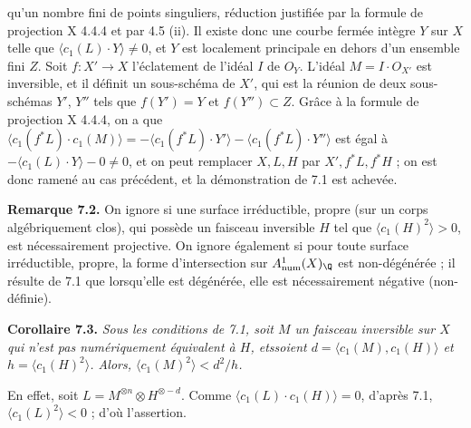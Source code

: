 
qu'un
nombre fini de points singuliers, r\'eduction justifi\'ee par la formule de projection X 4.4.4 et par 4.5 (ii). Il existe donc une courbe ferm\'ee int\`egre $Y$ sur $X$ telle que $\langle c_1(L)\cdot Y\rangle\ne0$, et $Y$ est localement principale en dehors d'un ensemble fini $Z$. Soit $f:X'\to X$ l'\'eclatement de l'id\'eal $I$ de ${O}_Y$. L'id\'eal $M=I\cdot{O}_{X'}$ est inversible, et il d\'efinit un sous-sch\'ema de $X'$, qui est la r\'eunion de deux sous-sch\'emas $Y'$, $Y''$ tels que $f(Y')=Y$ et $f(Y'')\subset Z$. Gr\^ace \`a la formule de projection X 4.4.4, on a que $\langle c_1(f^*L)\cdot c_1(M)\rangle=-\langle c_1(f^*L)\cdot Y'\rangle-\langle c_1(f^*L)\cdot Y''\rangle$ est \'egal \`a $-\langle c_1(L)\cdot Y\rangle-0\ne0$, et on peut remplacer $X,L,H$ par $X',f^*L,f^*H$ ; on est donc ramen\'e au cas pr\'ec\'edent, et la d\'emonstration de 7.1 est achev\'ee.

\textbf{Remarque 7.2.} On ignore si une surface irr\'eductible, propre (sur un corps alg\'ebriquement clos), qui poss\`ede un faisceau inversible $H$ tel que $\langle c_1(H)^2\rangle>0$, est n\'ecessairement projective. On ignore \'egalement si pour toute surface irr\'eductible, propre, la forme d'intersection sur $A^1_{\mathrm{num}}(X)_{\Q}$ est non-d\'eg\'en\'er\'ee ; il r\'esulte de 7.1 que lorsqu'elle est d\'eg\'en\'er\'ee, elle est n\'ecessairement n\'egative (non-d\'efinie).

\textbf{Corollaire 7.3.} \emph{Sous les conditions de 7.1, soit $M$ un faisceau inversible sur $X$ qui n'est pas num\'eriquement \'equivalent \`a $H$, etssoient $d=\langle c_1(M),c_1(H)\rangle$ et $h=\langle c_1(H)^2\rangle$. Alors, $\langle c_1(M)^2\rangle<d^2/h$.}

En effet, soit $L=M^{\otimes n}\otimes H^{\otimes -d}$. Comme $\langle c_1(L)\cdot c_1(H)\rangle=0$, d'apr\`es 7.1, $\langle c_1(L)^2\rangle<0$ ; d'o\`u l'assertion.

